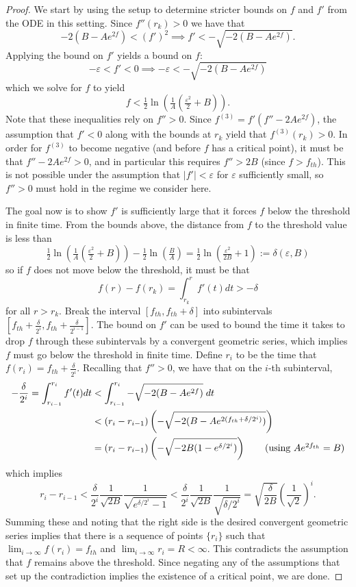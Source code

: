 \documentclass[10pt,a4paper]{amsart}
\renewcommand{\epsilon}{\varepsilon}
\begin{document}
\begin{proof}
  We start by using the setup to determine stricter bounds on $f$ and $f'$ from the ODE in this setting. Since $f''(r_{k})>0$ we have that
  \[
    -2(B-Ae^{2f})<(f')^{2} \implies f'<-\sqrt{-2(B-Ae^{2f})}.
  \]
  Applying the bound on $f'$ yields a bound on $f$: 
  \[
    -\epsilon<f'<0 \implies -\epsilon<-\sqrt{-2(B-Ae^{2f})}
  \]
  which we solve for $f$ to yield
  \[
    f<\tfrac{1}{2}\ln\left(\tfrac{1}{A}\left(\tfrac{\epsilon^{2}}{2}+B\right)\right).
  \]
  Note that these inequalities rely on $f''>0$. Since $f^{(3)}=f'(f''-2Ae^{2f})$, the assumption that $f'<0$ along with the bounds at $r_{k}$ yield that $f^{(3)}(r_k)>0$. In order for $f^{(3)}$ to become negative (and before $f$ has a critical point), it must be that $f''-2Ae^{2f}>0$, and in particular this requires $f''>2B$ (since $f>f_{th}$). This is not possible under the assumption that $|f'|<\epsilon$ for $\epsilon$ sufficiently small, so $f''>0$ must hold in the regime we consider here.

  The goal now is to show $f'$ is sufficiently large that it forces $f$ below the threshold in finite time. From the bounds above, the distance from $f$ to the threshold value is less than
  \[
    \tfrac{1}{2}\ln\left(\tfrac{1}{A}\left(\tfrac{\epsilon^{2}}{2}+B\right)\right) - \tfrac{1}{2}\ln\left(\tfrac{B}{A}\right) = \tfrac{1}{2}\ln\left(\tfrac{\epsilon^{2}}{2B}+1\right) := \delta(\epsilon, B)
  \]
  so if $f$ does not move below the threshold, it must be that
  \[
    f(r)-f(r_k) = \int_{r_{k}}^{r}f'(t)dt > -\delta
  \]
  for all $r>r_{k}$. Break the interval $[f_{th},f_{th}+\delta]$ into subintervals $[f_{th}+\tfrac{\delta}{2^i}, f_{th}+\tfrac{\delta}{2^{{i-1}}}]$. The bound on $f'$ can be used to bound the time it takes to drop $f$ through these subintervals by a convergent geometric series, which implies $f$ must go below the threshold in finite time. Define $r_{i}$ to be the time that $f(r_{i})=f_{th}+\tfrac{\delta}{2^i}$. Recalling that $f''>0$, we have that on the $i$-th subinterval,
  \begin{align*}
    -\frac{\delta}{2^{i}} = \int_{r_{i-1}}^{r_{i}}f'(t)dt &< \int_{r_{i-1}}^{r_{i}}-\sqrt{-2(B-Ae^{2f})}\;dt\\
      &< (r_{i}-r_{i-1})\left(-\sqrt{-2(B-Ae^{2(f_{th}+\delta/2^{i})})}\right)\\
      &= (r_{i}-r_{i-1})\left(-\sqrt{-2B(1-e^{\delta/2^{i}})}\right)   \tag*{(using $Ae^{2f_{th}}=B$)}
  \end{align*}
  which implies 
  \[
    r_{i}-r_{i-1}< \frac{\delta}{2^{i}}\frac{1}{\sqrt{2B}}\frac{1}{\sqrt{e^{\delta/2^{i}}-1}}<\frac{\delta}{2^{i}}\frac{1}{\sqrt{2B}}\frac{1}{\sqrt{\delta/2^{i}}}=\sqrt{\frac{\delta}{2B}}\left(\frac{1}{\sqrt{2}}\right)^{i}.
  \]
  Summing these and noting that the right side is the desired convergent geometric series implies that there is a sequence of points $\{r_{i}\}$ such that $\lim_{i\to\infty}f(r_{i})=f_{th}$ and $\lim_{i\to\infty}r_{i}=R<\infty$. This contradicts the assumption that $f$ remains above the threshold. Since negating any of the assumptions that set up the contradiction implies the existence of a critical point, we are done.
\end{proof}
\end{document}

